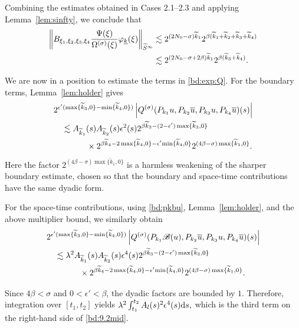 \documentclass[UTF-8,reqno]{amsart}
\numberwithin{equation}{section}
\theoremstyle{definition}
\def\dif{{\mathord{{\rm d}}}}
\def\min{{\mathord{{\rm min}}}}
\def\dif{{\mathord{{\rm d}}}}
\def\min{{\mathord{{\rm min}}}}
\begin{document}
Combining the estimates obtained in Cases 2.1--2.3 and applying
Lemma~\ref{lem:sinfty}, we conclude that
\begin{align}
\left\|
B_{\xi_1,\xi_2,\xi_3,\xi_4}
\frac{\Psi(\xi)}{\Omega^{(\sigma)}(\xi)}
\varphi_{\underline k}(\xi)
\right\|_{\widetilde S^\infty}
&\lesssim
2^{(2N_0-\sigma)\widetilde{k}_1}
2^{\beta(
\widetilde{k}_1+\widetilde{k}_2
+\widetilde{k}_3+\widetilde{k}_4)}
\notag\\
&\lesssim
2^{(2N_0-\sigma+2\beta)\widetilde{k}_1}
2^{\beta(\widetilde{k}_3+\widetilde{k}_4)}.
\notag
\end{align}

We are now in a position to estimate the terms in
\eqref{bd:exp:Q}. For the boundary terms, Lemma~\ref{lem:holder}
gives
\begin{align*}
&2^{\epsilon'
(\max\{\widetilde k_3,0\}
-\min\{\widetilde k_4,0\})}
\left|
Q^{(\sigma)}
(P_{k_1}u,P_{k_2}\overline u,
 P_{k_3}u,P_{k_4}\overline u)(s)
\right|
\\
&\quad\lesssim
A_{\widetilde k_1}(s)
A_{\widetilde k_2}(s)
\epsilon^2(s)
2^{\beta\widetilde{k}_3
-(2-\epsilon')\max\{\widetilde{k}_3,0\}}
\\
&\qquad\qquad\times
2^{\beta\widetilde{k}_4
-2\max\{\widetilde{k}_4,0\}
-\epsilon'\min\{\widetilde k_4,0\}}
2^{(4\beta-\sigma)\max\{\widetilde{k}_1,0\}}.
\end{align*}
Here the factor $  2^{(4\beta-\sigma)\max\{\widetilde k_1,0\}}$ 
is a harmless weakening of the sharper boundary estimate, chosen so
that the boundary and space-time contributions have the same dyadic
form.
  

For the space-time contributions, using \eqref{bd:pkbu},
Lemma~\ref{lem:holder}, and the above multiplier bound, we similarly
obtain
\begin{align*}
&2^{\epsilon'
(\max\{\widetilde k_3,0\}
-\min\{\widetilde k_4,0\})}
\left|
Q^{(\sigma)}
(P_{k_1}\mathscr B(u),P_{k_2}\overline u,
 P_{k_3}u,P_{k_4}\overline u)(s)
\right|
\\
&\quad\lesssim
\lambda^2
A_{\widetilde k_1}(s)
A_{\widetilde k_2}(s)
\epsilon^4(s)
2^{\beta\widetilde{k}_3
-(2-\epsilon')\max\{\widetilde{k}_3,0\}}
\\
&\qquad\qquad\times
2^{\beta\widetilde{k}_4
-2\max\{\widetilde{k}_4,0\}
-\epsilon'\min\{\widetilde k_4,0\}}
2^{(4\beta-\sigma)\max\{\widetilde{k}_1,0\}}.
\end{align*} 

Since $4\beta<\sigma$ and $0<\epsilon'<\beta$, the dyadic factors are
bounded by $1$. Therefore,  integration over $[t_1,t_2]$ yields $\lambda^2
    \int_{t_1}^{t_2}
    A_l(s)^2\epsilon^4(s)\dif s,$ 
which is the third term on the right-hand side of
\eqref{bd:9.2mid}. 
\end{document}
